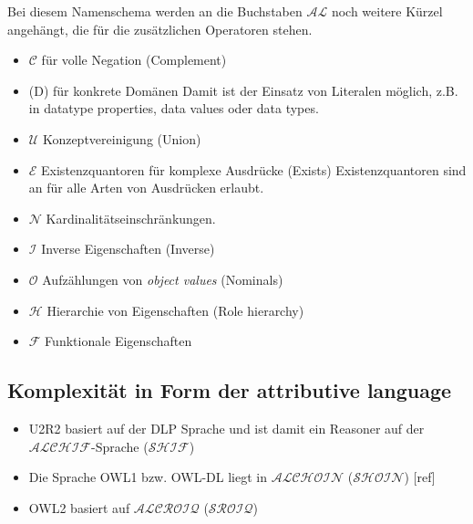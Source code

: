 Bei diesem Namenschema werden an die Buchstaben $\mathcal{AL}$ noch weitere Kürzel angehängt, die für die zusätzlichen Operatoren stehen.
\begin{itemize}
  \item $\mathcal{C}$ für volle Negation (Complement)
  \item (D) für konkrete Domänen\newline
Damit ist der Einsatz von Literalen möglich, z.B. in datatype properties, data values oder data types.
  \item $\mathcal{U}$ Konzeptvereinigung (Union)
  \item $\mathcal{E}$ Existenzquantoren für komplexe Ausdrücke (Exists)\newline
Existenzquantoren sind an für alle Arten von Ausdrücken erlaubt.
  \item $\mathcal{N}$ Kardinalitätseinschränkungen.
  \item $\mathcal{I}$ Inverse Eigenschaften (Inverse)
  \item $\mathcal{O}$ Aufzählungen von \emph{object values} (Nominals)
  \item $\mathcal{H}$ Hierarchie von Eigenschaften (Role hierarchy)
  \item $\mathcal{F}$ Funktionale Eigenschaften
\end{itemize}
\cite{wiki:DescriptionLogic}

\subsection{Komplexität in Form der attributive language}
\begin{itemize}
  \item U2R2 basiert auf der DLP Sprache und ist damit ein Reasoner auf der $\mathcal{ALCHIF}$-Sprache ($\mathcal{SHIF}$)
  \item Die Sprache OWL1 bzw. OWL-DL liegt in $\mathcal{ALCHOIN}$ ($\mathcal{SHOIN}$) [ref]
  \item OWL2 basiert auf $\mathcal{ALCROIQ}$ ($\mathcal{SROIQ}$) \cite{Krötzsch2008}
\end{itemize}


